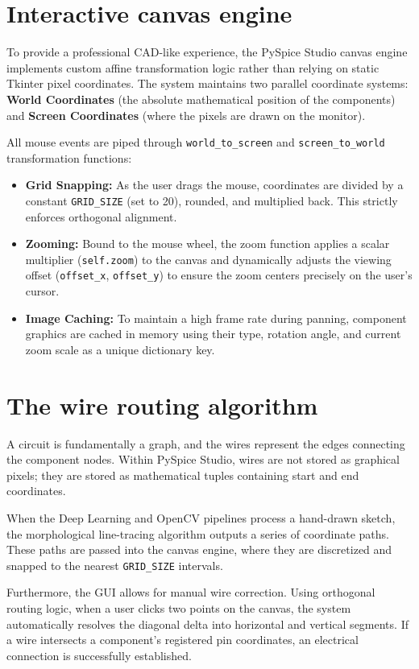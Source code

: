 \section{Interactive canvas engine}
To provide a professional CAD-like experience, the PySpice Studio canvas engine implements custom affine transformation logic rather than relying on static Tkinter pixel coordinates. The system maintains two parallel coordinate systems: \textbf{World Coordinates} (the absolute mathematical position of the components) and \textbf{Screen Coordinates} (where the pixels are drawn on the monitor).

All mouse events are piped through \texttt{world\_to\_screen} and \texttt{screen\_to\_world} transformation functions:
\begin{itemize}
    \item \textbf{Grid Snapping:} As the user drags the mouse, coordinates are divided by a constant \texttt{GRID\_SIZE} (set to 20), rounded, and multiplied back. This strictly enforces orthogonal alignment.
    \item \textbf{Zooming:} Bound to the mouse wheel, the zoom function applies a scalar multiplier (\texttt{self.zoom}) to the canvas and dynamically adjusts the viewing offset (\texttt{offset\_x}, \texttt{offset\_y}) to ensure the zoom centers precisely on the user's cursor.
    \item \textbf{Image Caching:} To maintain a high frame rate during panning, component graphics are cached in memory using their type, rotation angle, and current zoom scale as a unique dictionary key.
\end{itemize}

\section{The wire routing algorithm}
A circuit is fundamentally a graph, and the wires represent the edges connecting the component nodes. Within PySpice Studio, wires are not stored as graphical pixels; they are stored as mathematical tuples containing start and end coordinates.

When the Deep Learning and OpenCV pipelines process a hand-drawn sketch, the morphological line-tracing algorithm outputs a series of coordinate paths. These paths are passed into the canvas engine, where they are discretized and snapped to the nearest \texttt{GRID\_SIZE} intervals. 

Furthermore, the GUI allows for manual wire correction. Using orthogonal routing logic, when a user clicks two points on the canvas, the system automatically resolves the diagonal delta into horizontal and vertical segments. If a wire intersects a component's registered pin coordinates, an electrical connection is successfully established.

